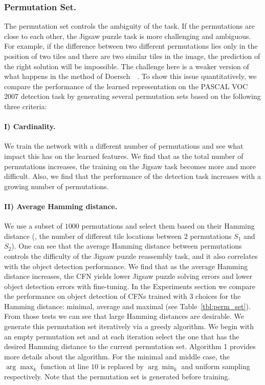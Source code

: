\documentclass[runningheads]{llncs}
\begin{document}
\subsubsection{Permutation Set.} \label{subsec:perm_set} The permutation set controls the ambiguity of the task. If the permutations are close to each other, the Jigsaw puzzle task is more challenging and ambiguous. For example, if the difference between two different permutations lies only in the position of two tiles and there are two similar tiles in the image, the prediction of the right solution will be impossible. The challenge here is a weaker version of what happens in the method of Doersch~\etal~\cite{Carl2015}. To show this issue quantitatively, we compare the performance of the learned representation on the PASCAL VOC 2007 detection task by generating several permutation sets based on the following three criteria:
\paragraph{I) Cardinality.} We train the network with a different number of permutations and see what impact this has on the learned features. We find that as the total number of permutations increases, the training on the Jigsaw task becomes more and more difficult. Also, we find that the performance of the detection task increases with a growing number of permutations. %
\paragraph{II) Average Hamming distance.}   We use a subset of $1000$ permutations and select them based on their Hamming distance (\ie, the number of different tile locations between $2$ permutations $S_1$ and $S_2$). One can see that the average Hamming distance between permutations controls the difficulty of the Jigsaw puzzle reassembly task, and it also correlates with the object detection performance. We find that as the average Hamming distance increases, the CFN yields lower Jigsaw puzzle solving errors and lower object detection errors with fine-tuning. In the Experiments section we compare the performance on object detection of CFNs trained with $3$ choices for the Hamming distance: minimal, average and maximal (see Table~\ref{tbl:perm_set}). From those tests we can see that large Hamming distances are desirable.
We generate this permutation set iteratively via a greedy algorithm. We begin with an empty permutation set and at each iteration select the one that has the desired Hamming distance to the current permutation set. Algorithm 1 provides more details about the algorithm. For the minimal and middle case, the $\arg\max_{k}$ function at line $10$ is replaced by $\arg\min_{k}$ and uniform sampling respectively. Note that the permutation set is generated before training.
\end{document}
